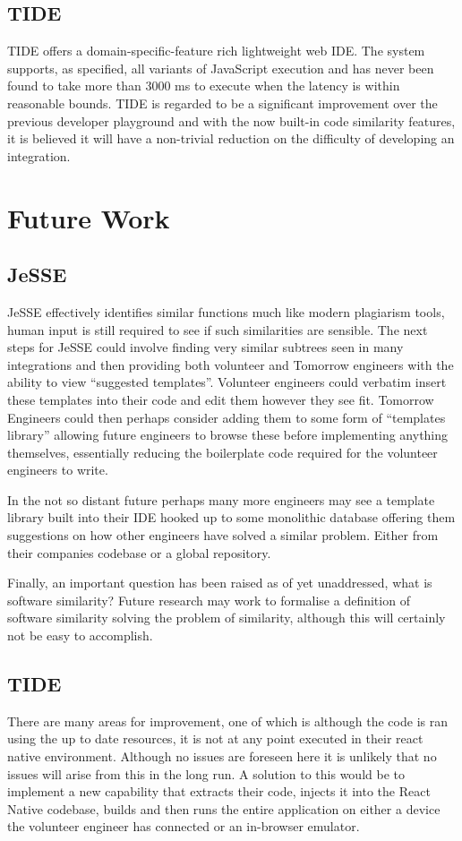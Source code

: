 \documentclass[jou,apacite]{apa6}
\begin{document}
\subsection{TIDE}
TIDE offers a domain-specific-feature rich lightweight web IDE. The system supports, as specified, all variants of JavaScript execution and has never been found to take more than 3000 ms to execute when the latency is within reasonable bounds. TIDE is regarded to be a significant improvement over the previous developer playground and with the now built-in code similarity features, it is believed it will have a non-trivial reduction on the difficulty of developing an integration.
 
 \clearpage
\section{Future Work}

\subsection{JeSSE}
 JeSSE effectively identifies similar functions much like modern plagiarism tools, human input is still required to see if such similarities are sensible. The next steps for JeSSE could involve finding very similar subtrees seen in many integrations and then providing both volunteer and Tomorrow engineers with the ability to view “suggested templates”. Volunteer engineers could verbatim insert these templates into their code and edit them however they see fit.  Tomorrow Engineers could then perhaps consider adding them to some form of “templates library” allowing future engineers to browse these before implementing anything themselves, essentially reducing the boilerplate code required for the volunteer engineers to write. 

In the not so distant future perhaps many more engineers may see a template library built into their IDE hooked up to some monolithic database offering them suggestions on how other engineers have solved a similar problem. Either from their companies codebase or a global repository.

Finally, an important question has been raised as of yet unaddressed, what is software similarity? Future research may work to formalise a definition of software similarity solving the problem of similarity, although this will certainly not be easy to accomplish. 

\subsection{TIDE}
There are many areas for improvement, one of which is although the code is ran using the up to date resources, it is not at any point executed in their react native environment. Although no issues are foreseen here it is unlikely that no issues will arise from this in the long run. A solution to this would be to implement a new capability that extracts their code, injects it into the React Native codebase, builds and then runs the entire application on either a device the volunteer engineer has connected or an in-browser emulator. 
\end{document}
